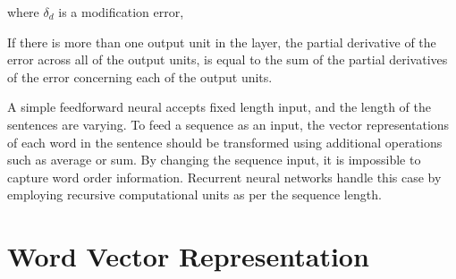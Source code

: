 \documentclass[12pt]{report} %
\begin{document}
where $\delta_{d}$ is a modification error,

%    

If there is more than one output unit in the layer, the partial derivative of the error across all of the output units, is equal to the sum of the partial derivatives of the error concerning each of the output units.

A simple feedforward neural accepts fixed length input, and the length of the sentences are varying. To feed a sequence as an input, the vector representations of each word in the sentence should be transformed using additional operations such as average or sum. By changing the sequence input, it is impossible to capture word order information. Recurrent neural networks handle this case by employing recursive computational units as per the sequence length.

\section{Word Vector Representation}
\end{document}
